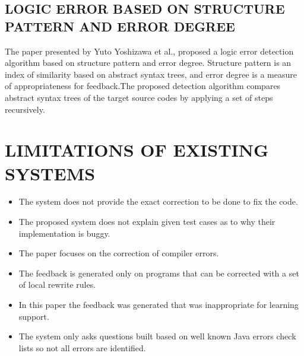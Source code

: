 \subsection{LOGIC ERROR BASED ON STRUCTURE PATTERN AND ERROR DEGREE}
The paper presented by Yuto Yoshizawa et  al.,\cite{8517171} proposed a logic error detection algorithm based on structure pattern and error degree. Structure pattern is an index of similarity based on abstract syntax trees, and error
degree is a measure of appropriateness for feedback.The proposed detection algorithm compares abstract syntax
trees of the target source codes by applying a set of steps
recursively.

\section{\uppercase{LIMITATIONS OF EXISTING SYSTEMS}}
\begin{itemize}
\item The system does not  provide the exact correction to be done to fix the code.\cite{10.1145/3360614}
\item The proposed system does not  explain given  test cases as to why their implementation is buggy.\cite{pmlr-v139-yasunaga21a}
\item The paper focuses on the correction of compiler errors.\cite{10.1145/2499370.2462195}
\item The feedback is generated only on programs that can be corrected with a set of local rewrite rules.\cite{10.1145/3428205}
\item  In this paper the feedback was generated that was inappropriate for learning support.\cite{8672669}
\item The system only asks questions built based on well known Java errors check lists so not all errors are identified.\cite{8672669}

\end{itemize}

